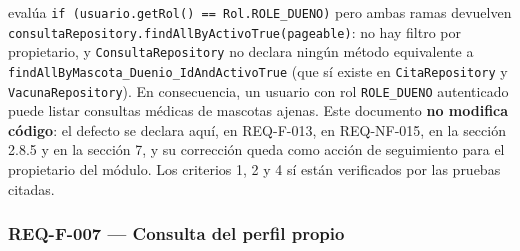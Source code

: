 \documentclass[
  spanish,
]{article}
\begin{document}
\begin{itemize}
  evalúa \texttt{if\ (usuario.\allowbreak{}get\allowbreak{}Rol()\ ==\ Rol.\allowbreak{}ROLE\_\allowbreak{}DUENO)} pero ambas
  ramas devuelven
  \texttt{consulta\allowbreak{}Repository.\allowbreak{}find\allowbreak{}All\allowbreak{}By\allowbreak{}Activo\allowbreak{}True(pageable)}: no hay
  filtro por propietario, y \texttt{Consulta\allowbreak{}Repository} no declara
  ningún método equivalente a
  \texttt{find\allowbreak{}All\allowbreak{}By\allowbreak{}Mascota\_\allowbreak{}Duenio\_\allowbreak{}Id\allowbreak{}And\allowbreak{}Activo\allowbreak{}True} (que sí existe en
  \texttt{Cita\allowbreak{}Repository} y \texttt{Vacuna\allowbreak{}Repository}). En consecuencia,
  un usuario con rol \texttt{ROLE\_\allowbreak{}DUENO} autenticado puede listar
  consultas médicas de mascotas ajenas. Este documento \textbf{no
  modifica código}: el defecto se declara aquí, en REQ-F-013, en
  REQ-NF-015, en la sección 2.8.5 y en la sección 7, y su corrección
  queda como acción de seguimiento para el propietario del módulo. Los
  criterios 1, 2 y 4 sí están verificados por las pruebas citadas.
\end{itemize}

\subsubsection{REQ-F-007 --- Consulta del perfil
propio}\label{req-f-007-consulta-del-perfil-propio}
\end{document}
